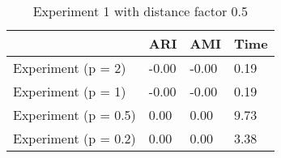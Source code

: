 \begin{table}
\centering
\caption{Experiment 1 with distance factor 0.5}
\begin{tabular}{llll}
\toprule
{} &    ARI &    AMI &  Time \\
\midrule
Experiment (p = 2)   &  -0.00 &  -0.00 &  0.19 \\
Experiment (p = 1)   &  -0.00 &  -0.00 &  0.19 \\
Experiment (p = 0.5) &   0.00 &   0.00 &  9.73 \\
Experiment (p = 0.2) &   0.00 &   0.00 &  3.38 \\
\bottomrule
\end{tabular}
\end{table}
